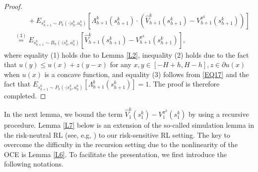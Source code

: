 \documentclass[11pt]{article}
\newcommand{\1}{\mathbbm{1}}
\begin{document}
\begin{proof}
\begin{align*}
& \quad \quad +E_{s_{h+1}^k\sim P_{h}(\cdot\vert s_h^k,a_h^k)}\left [\Lambda^k_{h+1}(s_{h+1}^k) \cdot (\hat{V}_{h+1}^k(s_{h+1}^k)-V_{h+1}^{\pi^k}(s_{h+1}^k))\right ]\\
&\overset{(3)}{=}E_{s_{h+1}^k\sim B_h(\cdot\vert s_h^k,a_h^k)}[\hat{V}_{h+1}^k(s_{h+1}^k)-V_{h+1}^{\pi^k}(s_{h+1}^k)],
\end{align*}
where equality (1) holds due to Lemma \ref{L2}, inequality (2) holds due to the fact that $u(y)\leq u(x)+z(y-x)$ for any $x,y\in [-H+h,H-h],z\in \partial u(x)$ when $u(x)$ is a concave function, and equality (3) follows from \eqref{EQ17} and the fact that $E_{s_{h+1}^k\sim P_h(\cdot\vert s_h^k,a_h^k)}[\Lambda^k_{h+1}(s_{h+1}^k)]=1$. The proof is therefore completed. 
\end{proof}



In the next lemma, we bound the term $\hat{V}_1^k(s_1^k)-V_1^{\pi^k}(s_1^k)$ by using a recursive procedure. Lemma \ref{L7} below is an extension of the so-called simulation lemma in the risk-neutral RL (see, e.g, \cite{agarwal2019reinforcement}) to our risk-sensitive RL setting. The key to overcome the difficulty in the recursion setting due to the nonlinearity of the OCE is Lemma \ref{L6}. To facilitate the presentation, we first introduce the following notations. 
\end{document}
